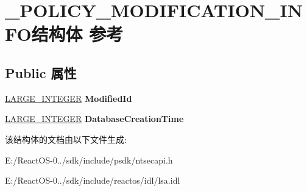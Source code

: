 \hypertarget{struct___p_o_l_i_c_y___m_o_d_i_f_i_c_a_t_i_o_n___i_n_f_o}{}\section{\+\_\+\+P\+O\+L\+I\+C\+Y\+\_\+\+M\+O\+D\+I\+F\+I\+C\+A\+T\+I\+O\+N\+\_\+\+I\+N\+F\+O结构体 参考}
\label{struct___p_o_l_i_c_y___m_o_d_i_f_i_c_a_t_i_o_n___i_n_f_o}
\subsection*{Public 属性}
\begin{DoxyCompactItemize}
\item 
\mbox{\label{struct___p_o_l_i_c_y___m_o_d_i_f_i_c_a_t_i_o_n___i_n_f_o_a5ab032f2939a55cb0e8a3ad2a24573e0}} 
\hyperlink{union___l_a_r_g_e___i_n_t_e_g_e_r}{L\+A\+R\+G\+E\+\_\+\+I\+N\+T\+E\+G\+ER} {\bfseries Modified\+Id}
\item 
\mbox{\label{struct___p_o_l_i_c_y___m_o_d_i_f_i_c_a_t_i_o_n___i_n_f_o_a5085ec13d7a94cd849aca39615e58688}} 
\hyperlink{union___l_a_r_g_e___i_n_t_e_g_e_r}{L\+A\+R\+G\+E\+\_\+\+I\+N\+T\+E\+G\+ER} {\bfseries Database\+Creation\+Time}
\end{DoxyCompactItemize}


该结构体的文档由以下文件生成\+:\begin{DoxyCompactItemize}
\item 
E\+:/\+React\+O\+S-\/0../sdk/include/psdk/ntsecapi.\+h\item 
E\+:/\+React\+O\+S-\/0../sdk/include/reactos/idl/lsa.\+idl\end{DoxyCompactItemize}
